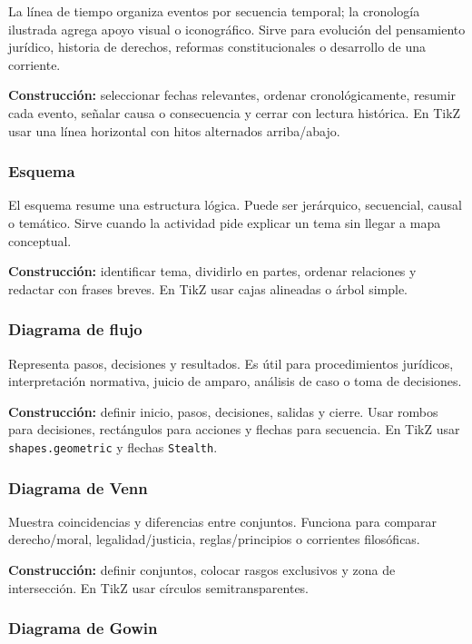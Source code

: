 La línea de tiempo organiza eventos por secuencia temporal; la cronología ilustrada agrega apoyo visual o iconográfico. Sirve para evolución del pensamiento jurídico, historia de derechos, reformas constitucionales o desarrollo de una corriente.

\textbf{Construcción:} seleccionar fechas relevantes, ordenar cronológicamente, resumir cada evento, señalar causa o consecuencia y cerrar con lectura histórica. En TikZ usar una línea horizontal con hitos alternados arriba/abajo.

\subsubsection*{Esquema}

El esquema resume una estructura lógica. Puede ser jerárquico, secuencial, causal o temático. Sirve cuando la actividad pide explicar un tema sin llegar a mapa conceptual.

\textbf{Construcción:} identificar tema, dividirlo en partes, ordenar relaciones y redactar con frases breves. En TikZ usar cajas alineadas o árbol simple.

\subsubsection*{Diagrama de flujo}

Representa pasos, decisiones y resultados. Es útil para procedimientos jurídicos, interpretación normativa, juicio de amparo, análisis de caso o toma de decisiones.

\textbf{Construcción:} definir inicio, pasos, decisiones, salidas y cierre. Usar rombos para decisiones, rectángulos para acciones y flechas para secuencia. En TikZ usar \texttt{shapes.geometric} y flechas \texttt{Stealth}.

\subsubsection*{Diagrama de Venn}

Muestra coincidencias y diferencias entre conjuntos. Funciona para comparar derecho/moral, legalidad/justicia, reglas/principios o corrientes filosóficas.

\textbf{Construcción:} definir conjuntos, colocar rasgos exclusivos y zona de intersección. En TikZ usar círculos semitransparentes.

\subsubsection*{Diagrama de Gowin}

